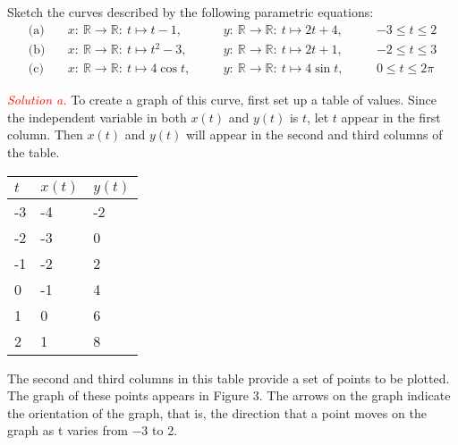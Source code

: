 \documentclass{report}
\begin{document}
    \begin{exm}
        Sketch the curves described by the following parametric equations:
        \begin{equation}
            \begin{alignedat}{3}
                \text{(a)}\quad &x:\ \mathbb{R} \to \mathbb{R}:\ t \mapsto t - 1, \quad &&y:\ \mathbb{R} \to \mathbb{R}:\ t\mapsto 2t+4, \quad &&-3 \leq t \leq 2 \\
                \text{(b)}\quad &x:\ \mathbb{R} \to \mathbb{R}:\ t\mapsto t^{2}-3, \quad &&y:\ \mathbb{R} \to \mathbb{R}:\ t\mapsto 2t+1 , \quad &&-2 \leq t \leq 3 \\
                \text{(c)}\quad &x:\ \mathbb{R} \to \mathbb{R}:\ t\mapsto 4\cos{t}, \quad &&y:\ \mathbb{R} \to \mathbb{R}:\ t\mapsto 4\sin{t}, \quad &&0 \leq t \leq 2\pi
            \end{alignedat}
        \end{equation}
    \end{exm}
    \bigbreak \noindent 
    \textcolor{red}{\textit{Solution a.}}
    To create a graph of this curve, first set up a table of values. Since the independent variable in both \( x(t) \) and \( y(t) \) is \( t \), let \( t \) appear in the first column. Then \( x(t) \) and \( y(t) \) will appear in the second and third columns of the table.
    \bigbreak \noindent 
    \begin{tabularx}{\textwidth}{|X|X|X|}
        \hline
        \( t \) & \( x(t) \) & \( y(t) \) \\
        \hline
        -3 & -4 & -2 \\
        -2 & -3 & 0 \\
        -1 & -2 & 2 \\
        0 & -1 & 4 \\
        1 & 0 & 6 \\
        2 & 1 & 8 \\
        \hline
    \end{tabularx}
    \bigbreak \noindent 
    \begin{minipage}[b]{0.47\textwidth}
        The second and third columns in this table provide a set of points to be plotted. The graph of these points appears in Figure 3. The arrows on the graph indicate the orientation of the graph, that is, the direction that a point moves on the graph as t varies from −3 to 2.
    \end{minipage}
\end{document}

